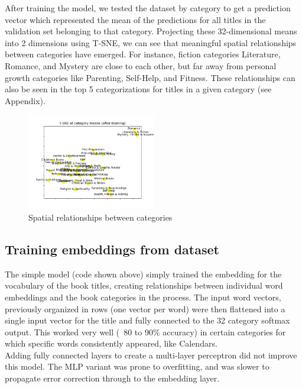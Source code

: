 \documentclass[jou,apacite, 10px]{apa6}
\begin{document}
After training the model, we tested the dataset by category to get a prediction vector which represented the mean of the predictions for all titles in the validation set belonging to that category. Projecting these 32-dimensional means into 2 dimensions using T-SNE, we can see that meaningful spatial relationships between categories have emerged. For instance, fiction categories Literature, Romance, and Mystery are close to each other, but far away from personal growth categories like Parenting, Self-Help, and Fitness. These relationships can also be seen in the top 5 categorizations for titles in a given category (see Appendix).

\begin{figure}[h!]
\captionsetup{justification=centering}
    \centering
     \includegraphics[width=0.5\textwidth]{images/tsne-categories-small}
        \caption{Spatial relationships between categories}
\end{figure}

\subsection{Training embeddings from dataset}
The simple model (code shown above) simply trained the embedding for the vocabulary of the book titles, creating relationships between individual word embeddings and the book categories in the process. The input word vectors, previously organized in rows (one vector per word) were then flattened into a single input vector for the title and fully connected to the 32 category softmax output. This worked very well (~80 to 90\% accuracy) in certain categories for which specific words consistently appeared, like Calendars.\\

Adding fully connected layers to create a multi-layer perceptron did not improve this model. The MLP variant was prone to overfitting, and was slower to propagate error correction through to the embedding layer.\\
\end{document}
